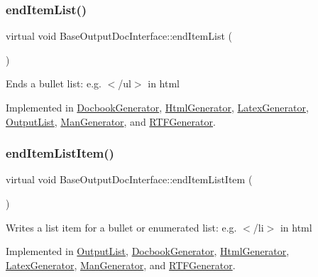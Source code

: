 \subsubsection{\texorpdfstring{endItemList()}{endItemList()}}
{\footnotesize\ttfamily virtual void Base\+Output\+Doc\+Interface\+::end\+Item\+List (\begin{DoxyParamCaption}{ }\end{DoxyParamCaption})\hspace{0.3cm}{\ttfamily [pure virtual]}}

Ends a bullet list\+: e.\+g. {\ttfamily $<$/ul$>$} in html 

Implemented in \mbox{\hyperlink{class_docbook_generator_a5e463c37de0b0473855605fe5cf44071}{Docbook\+Generator}}, \mbox{\hyperlink{class_html_generator_aa5dc9b6c49ebf68dd54942d258716206}{Html\+Generator}}, \mbox{\hyperlink{class_latex_generator_ad126330bd7b18c670464599fdfc262ab}{Latex\+Generator}}, \mbox{\hyperlink{class_output_list_ac6efca5985597bb6e51427c51d40732f}{Output\+List}}, \mbox{\hyperlink{class_man_generator_abb7aa578a49c62b103f85e0f5d3c9e2a}{Man\+Generator}}, and \mbox{\hyperlink{class_r_t_f_generator_a530e2868f7db6b92a4423cdee7fc9f75}{R\+T\+F\+Generator}}.

\mbox{\label{class_base_output_doc_interface_a90d290d7a06a9e7ecd968c8da90ed665}} 
\subsubsection{\texorpdfstring{endItemListItem()}{endItemListItem()}}
{\footnotesize\ttfamily virtual void Base\+Output\+Doc\+Interface\+::end\+Item\+List\+Item (\begin{DoxyParamCaption}{ }\end{DoxyParamCaption})\hspace{0.3cm}{\ttfamily [pure virtual]}}

Writes a list item for a bullet or enumerated list\+: e.\+g. {\ttfamily $<$/li$>$} in html 

Implemented in \mbox{\hyperlink{class_output_list_a784d921c1961db570e1b12905fe97c05}{Output\+List}}, \mbox{\hyperlink{class_docbook_generator_a6a0d36a22a9ca268b716cd37a4ab13b0}{Docbook\+Generator}}, \mbox{\hyperlink{class_html_generator_a91f6100cb025e52c1cef35b8749761b2}{Html\+Generator}}, \mbox{\hyperlink{class_latex_generator_a32c196e3b968d56ed445bb3bc090ca6b}{Latex\+Generator}}, \mbox{\hyperlink{class_man_generator_a87a722d58e6364660622ab086f20edc8}{Man\+Generator}}, and \mbox{\hyperlink{class_r_t_f_generator_a4d3cc3baac4adda9ef5da4c9e470871b}{R\+T\+F\+Generator}}.

